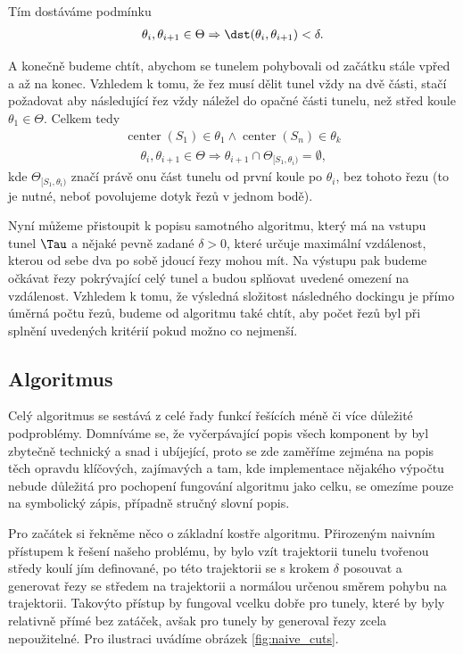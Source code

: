 Tím dostáváme podmínku
\begin{align}
    \theta_i, \theta_{i+1} \in \Theta \Rightarrow \dst(\theta_i, \theta_{i+1}) < \delta.
\end{align}

A konečně budeme chtít, abychom se tunelem pohybovali od začátku stále vpřed
a až na konec.
Vzhledem k tomu, že řez musí dělit tunel vždy na dvě části, stačí požadovat
aby následující řez vždy náležel do opačné části tunelu, než střed koule
$ \theta_1 \in \Theta $. Celkem tedy
\begin{align}
    \operatorname{center}(S_1) \in \theta_1 \wedge \operatorname{center}(S_n) \in \theta_k
\end{align}
\begin{align}
    \theta_i, \theta_{i+1} \in \Theta
        \Rightarrow \theta_{i+1} \cap \Theta_{[S_1, \theta_i)} = \emptyset \text{,}
\end{align}
kde $ \Theta_{[S_1, \theta_i)} $ značí právě onu část tunelu od první koule po
$ \theta_i $, bez tohoto řezu (to je nutné, neboť povolujeme dotyk řezů v jednom bodě).

Nyní můžeme přistoupit k popisu samotného algoritmu, který má na vstupu tunel $ \Tau $
a nějaké pevně zadané $ \delta > 0$, které určuje maximální vzdálenost, kterou
od sebe dva po sobě jdoucí řezy mohou mít. Na výstupu pak budeme očkávat řezy pokrývající
celý tunel a budou splňovat uvedené omezení na vzdálenost. Vzhledem k tomu, že výsledná
složitost následného dockingu je přímo úměrná počtu řezů, budeme od algoritmu také chtít,
aby počet řezů byl při splnění uvedených kritérií pokud možno co nejmenší.


\subsection{Algoritmus}

Celý algoritmus se sestává z celé řady funkcí řešících méně či více důležité podproblémy.
Domníváme se, že vyčerpávající popis všech komponent by byl zbytečně technický a snad i
ubíjející, proto se zde zaměříme zejména na popis těch opravdu klíčových, zajímavých
a tam, kde implementace nějakého výpočtu nebude důležitá pro pochopení fungování
algoritmu jako celku, se omezíme pouze na symbolický zápis, případně stručný slovní
popis.

Pro začátek si řekněme něco o základní kostře algoritmu. Přirozeným naivním přístupem
k řešení našeho problému, by bylo vzít trajektorii tunelu tvořenou středy koulí
jím definované, po této trajektorii se s krokem $ \delta $ posouvat a generovat
řezy se středem na trajektorii a normálou určenou směrem pohybu na trajektorii.
Takovýto přístup by fungoval vcelku dobře pro tunely, které by byly relativně
přímé bez zatáček, avšak pro  tunely by generoval řezy zcela nepoužitelné.
Pro ilustraci uvádíme obrázek \ref{fig:naive_cuts}.

